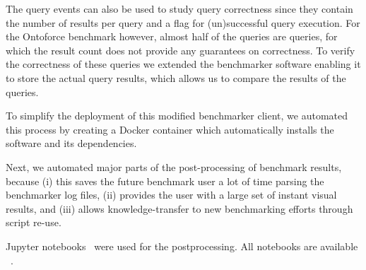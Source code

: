 \begin{table}[htbp!]
	\centering
	\caption{Schema of the query events used for all benchmark results in this work}
	\label{table:queryevents}
\end{table}

The query events can also be used to study query correctness since they contain the number of results per query and a flag for (un)successful query execution. For the Ontoforce benchmark however, almost half of the queries are  queries, for which the result count does not provide any guarantees on correctness. 
To verify the correctness of these queries we extended the benchmarker software enabling it to store the actual query results, which allows us to compare the results of the  queries. 

To simplify the deployment of this modified benchmarker client, we automated this process by creating a Docker container which automatically installs the software and its dependencies.

Next, we automated major parts of the post-processing of benchmark results, because (i) this saves the future benchmark user a lot of time parsing the benchmarker log files, (ii) provides the user with a large set of instant visual results, and (iii) allows knowledge-transfer to new benchmarking efforts through script re-use.

Jupyter notebooks~\cite{jupyter} were used for the postprocessing. All notebooks are available ~\cite{bmpostprocessing}. 

